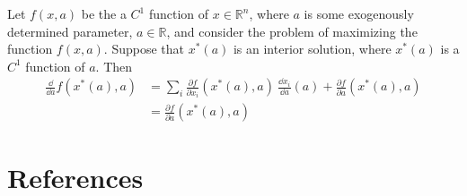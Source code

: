 \documentclass[twoside]{article}
\newcommand\pp{\partial}
\begin{document}
\begin{theorem}
  Let $f(x,a)$ be the a $C^1$ function of $x \in \mathbb{R}^n$, where $a$ is some exogenously determined parameter, $a\in \mathbb{R}$, and consider the problem of maximizing the function $f(x,a)$. Suppose that $x^*(a)$ is an interior solution, where $x^*(a)$ is a $C^1$ function of $a$. Then
  \begin{equation}
  \begin{aligned}
    \frac{\dd }{\dd a}f(x^*(a),a) & = \sum_i \frac{\partial f}{\partial x_i}(x^*(a),a) ~ \frac{\dd x_i}{\dd a}(a) + \frac{\pp f}{\pp a}(x^*(a),a)\\
    & = \frac{\pp f}{\pp a}(x^*(a),a)
  \end{aligned}
  \end{equation}
\end{theorem}












\clearpage
\section*{References}

\end{document}
